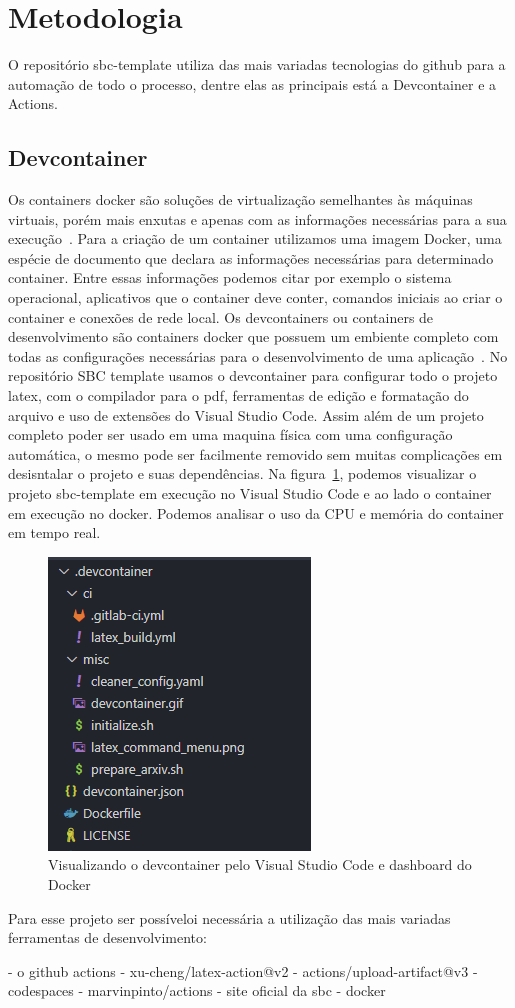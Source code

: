 \section{Metodologia}

O repositório sbc-template utiliza das mais variadas tecnologias do github para a automação de todo o processo, dentre elas as principais está a Devcontainer e a Actions.

\subsection{Devcontainer}
Os containers docker são soluções de virtualização semelhantes às máquinas virtuais, porém mais enxutas e apenas com as informações necessárias para a sua execução~\cite{vitalino:01}. Para a criação de um container utilizamos uma imagem Docker, uma espécie de documento que declara as informações necessárias para determinado container. Entre essas informações podemos citar por exemplo o sistema operacional, aplicativos que o container deve conter, comandos iniciais ao criar o container e conexões de rede local.
Os devcontainers ou containers de desenvolvimento são containers docker que possuem um embiente completo com todas as configurações necessárias para o desenvolvimento de uma aplicação~\cite{github:01}. No repositório SBC template usamos o devcontainer para configurar todo o projeto latex, com o compilador para o pdf, ferramentas de edição e formatação do arquivo e uso de extensões do Visual Studio Code. Assim além de um projeto completo poder ser usado em uma maquina física com uma configuração automática, o mesmo pode ser facilmente removido sem muitas complicações em desisntalar o projeto e suas dependências.
Na figura~\ref{fig:image12}, podemos visualizar o projeto sbc-template em execução no Visual Studio Code e ao lado o container em execução no docker. Podemos analisar o uso da CPU e memória do container em tempo real.

\begin{figure}[ht]
	\centering
	\includegraphics[width=.5\textwidth]{./images/image12.png}
	\caption{Visualizando o devcontainer pelo Visual Studio Code e dashboard do Docker}
	\label{fig:image12}
\end{figure}


Para esse projeto ser possíveloi necessária a utilização das mais variadas ferramentas de desenvolvimento:

- o github actions
- xu-cheng/latex-action@v2
- actions/upload-artifact@v3
- codespaces
- marvinpinto/actions
- site oficial da sbc
- docker
